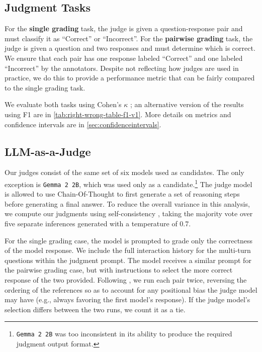 \documentclass{article}
\begin{document}
\subsection{Judgment Tasks}



For the {\bf single grading} task, the judge is given a question-response pair and must classify it as ``Correct'' or ``Incorrect''.  For the {\bf pairwise grading} task, the judge is given a question and two responses and must determine which is correct. We ensure that each pair has one response labeled ``Correct'' and one labeled ``Incorrect'' by the annotators. Despite not reflecting how judges are used in practice, we do this to provide a performance metric that can be fairly compared to the single grading task.

We evaluate both tasks using Cohen's $\kappa$ \citep{CohenKappa}; an alternative version of the results using F1 are in \cref{tab:right-wrong-table-f1-v1}. More details on metrics and confidence intervals are in \cref{sec:confidenceintervals}.



  


\subsection{LLM-as-a-Judge}

Our judges consist of the same set of six models used as candidates. The only exception is \texttt{Gemma 2 2B}, which was used only as a candidate.\footnote{\texttt{Gemma 2 2B} was too inconsistent in its ability to produce the required judgment output format.} The judge model is allowed to use Chain-Of-Thought \citep{ChainOfThought} to first generate a set of reasoning steps before generating a final answer.  To reduce the overall variance in this analysis, we compute our judgments using self-consistency \citep{selfconsistency}, taking the majority vote over five separate inferences generated with a temperature of 0.7.

For the single grading case, the model is prompted to grade only the correctness of the model response. We include the full interaction history for the multi-turn questions within the judgment prompt. The model receives a similar prompt for the pairwise grading case, but with instructions to select the more correct response of the two provided. Following \citet{mtbench}, we run each pair twice, reversing the ordering of the references so as to account for any positional bias the judge model may have (e.g., always favoring the first model's response). If the judge model's selection differs between the two runs, we count it as a tie.
\end{document}
